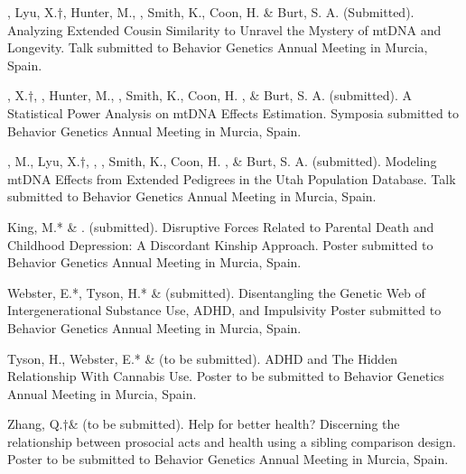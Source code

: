 
\item \meb, Lyu, X.$\dagger$, Hunter, M.,  \Joe, Smith, K., Coon, H. \& Burt, S. A. (Submitted). Analyzing Extended Cousin Similarity to Unravel the Mystery of mtDNA and Longevity. Talk submitted to Behavior Genetics Annual Meeting in Murcia, Spain.

\item \Lyu, X.$\dagger$, \meb, Hunter, M.,  \Joe, Smith, K., Coon, H. , \& Burt, S. A. (submitted). A Statistical Power Analysis on mtDNA Effects Estimation. Symposia submitted to Behavior Genetics Annual Meeting in Murcia, Spain.

\item \Hunter, M., Lyu, X.$\dagger$, \meb,  \Joe, Smith, K., Coon, H. , \& Burt, S. A. (submitted). Modeling mtDNA Effects from Extended Pedigrees in the Utah Population Database. Talk submitted to Behavior Genetics Annual Meeting in Murcia, Spain.

\item  King, M.* \& \meb. (submitted).  Disruptive Forces Related to Parental Death and Childhood Depression: A Discordant Kinship Approach. Poster submitted to Behavior Genetics Annual Meeting in Murcia, Spain.

\item Webster, E.*, Tyson, H.* \& \meb (submitted). Disentangling the Genetic Web of Intergenerational Substance Use, ADHD, and Impulsivity Poster submitted to Behavior Genetics Annual Meeting in Murcia, Spain.


\item Tyson, H., Webster, E.*  \& \meb (to be submitted). ADHD and The Hidden Relationship With Cannabis Use. Poster to be submitted to Behavior Genetics Annual Meeting in Murcia, Spain.

\item Zhang, Q.$\dagger$\& \meb (to be submitted). Help for better health? Discerning the relationship between prosocial acts and health using a sibling comparison design. Poster to be submitted to Behavior Genetics Annual Meeting in Murcia, Spain.




%
%

%

%

%

%
